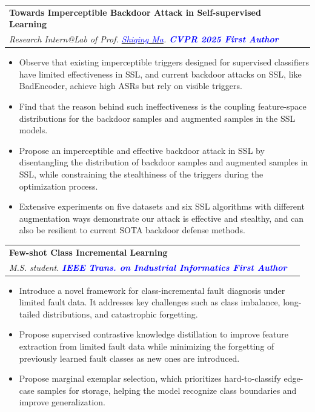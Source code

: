 \documentclass[letterpaper,11pt]{article}
\makeatletter
\newcommand{\resumeItem}[1]{
  \item\small{
    {#1 \vspace{-2pt}}
  }
}
\newcommand{\resumeSubheading}[4]{
  \vspace{-2pt}\item
    \begin{tabular*}{1.0\textwidth}[t]{l@{\extracolsep{\fill}}r}
      \textbf{#1} & \textbf{\small #2} \\
      \textit{\small#3} & \makebox[0pt][r]{\textit{\small #4}} \\

    \end{tabular*}\vspace{-6pt}
}
\newcommand{\resumeItemListStart}{\begin{itemize}}
\newcommand{\resumeItemListEnd}{\end{itemize}\vspace{-5pt}}
\makeatother
\begin{document}
    \resumeSubheading
      {Towards Imperceptible Backdoor Attack in Self-supervised Learning}{}
      {Research Intern@Lab of Prof. \href{https://people.cs.umass.edu/~shiqingma/}{\textcolor{blue}{Shiqing Ma}}. \textcolor{blue}{\textbf{CVPR 2025 First Author}}}{UMass Amherst}
      \resumeItemListStart
        \resumeItem{Observe that existing imperceptible triggers designed for supervised classifiers have limited effectiveness in SSL, and current backdoor attacks on SSL, like BadEncoder, achieve high ASRs but rely on visible triggers.}
        \resumeItem{Find that the reason behind such ineffectiveness is the coupling feature-space distributions for the backdoor samples and augmented samples in the SSL models.}
        \resumeItem{Propose an imperceptible and effective backdoor attack in SSL by disentangling the distribution of backdoor samples and augmented samples in SSL, while constraining the stealthiness of the triggers during the optimization process.}
        \resumeItem{Extensive experiments on five datasets and six SSL algorithms with different augmentation ways demonstrate our attack is effective and stealthy, and can also be resilient to current SOTA backdoor defense methods.}

      \resumeItemListEnd

    \resumeSubheading
      {Few-shot Class Incremental Learning}{}
      {M.S. student. \textcolor{blue}{\textbf{IEEE Trans. on Industrial Informatics First Author}}}{Zhejiang University}
      \resumeItemListStart
        \resumeItem{Introduce a novel framework for class-incremental fault diagnosis under limited fault data. It addresses key challenges such as class imbalance, long-tailed distributions, and catastrophic forgetting.}
        \resumeItem{Propose supervised contrastive knowledge distillation to improve feature extraction from limited fault data while minimizing the forgetting of previously learned fault classes as new ones are introduced.}
        \resumeItem{Propose marginal exemplar selection, which prioritizes hard-to-classify edge-case samples for storage, helping the model recognize class boundaries and improve generalization.}
      \resumeItemListEnd
\end{document}
